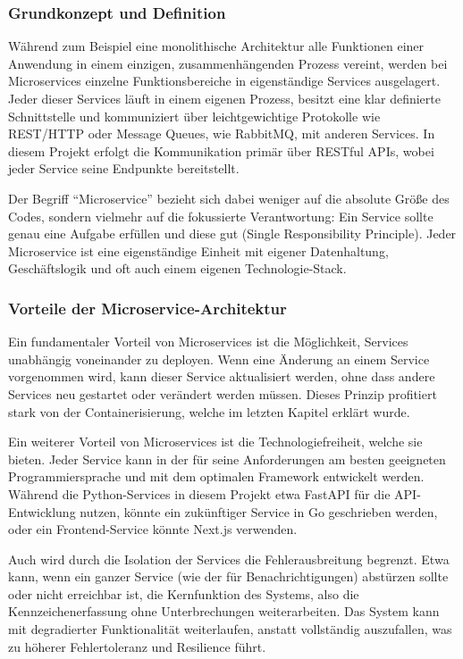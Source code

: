 \subsubsection{Grundkonzept und Definition}
Während zum Beispiel eine monolithische Architektur alle Funktionen einer Anwendung in einem einzigen, zusammenhängenden Prozess vereint, werden bei Microservices einzelne Funktionsbereiche in eigenständige Services ausgelagert.
Jeder dieser Services läuft in einem eigenen Prozess, besitzt eine klar definierte Schnittstelle und kommuniziert über leichtgewichtige Protokolle wie REST/HTTP oder Message Queues, wie RabbitMQ, mit anderen Services. \cite{aws_microservices}
In diesem Projekt erfolgt die Kommunikation primär über RESTful APIs, wobei jeder Service seine Endpunkte bereitstellt.

Der Begriff "`Microservice"' bezieht sich dabei weniger auf die absolute Größe des Codes, sondern vielmehr auf die fokussierte Verantwortung: Ein Service sollte genau eine Aufgabe erfüllen und diese gut (Single Responsibility Principle). Jeder Microservice ist eine eigenständige Einheit mit eigener Datenhaltung, Geschäftslogik und oft auch einem eigenen Technologie-Stack. \cite{oso_microservices}

\subsubsection{Vorteile der Microservice-Architektur}
Ein fundamentaler Vorteil von Microservices ist die Möglichkeit, Services unabhängig voneinander zu deployen.
Wenn eine Änderung an einem Service vorgenommen wird, kann dieser Service aktualisiert werden, ohne dass andere Services neu gestartet oder verändert werden müssen.
Dieses Prinzip profitiert stark von der Containerisierung, welche im letzten Kapitel erklärt wurde. \cite{aws_microservices}

Ein weiterer Vorteil von Microservices ist die Technologiefreiheit, welche sie bieten.
Jeder Service kann in der für seine Anforderungen am besten geeigneten Programmiersprache und mit dem optimalen Framework entwickelt werden.
Während die Python-Services in diesem Projekt etwa FastAPI für die API-Entwicklung nutzen, könnte ein zukünftiger Service in Go geschrieben werden, oder ein Frontend-Service könnte Next.js verwenden.

Auch wird durch die Isolation der Services die Fehlerausbreitung begrenzt.
Etwa kann, wenn ein ganzer Service (wie der für Benachrichtigungen) abstürzen sollte oder nicht erreichbar ist, die Kernfunktion des Systems, also die Kennzeichenerfassung ohne Unterbrechungen weiterarbeiten.
Das System kann mit degradierter Funktionalität weiterlaufen, anstatt vollständig auszufallen, was zu höherer Fehlertoleranz und Resilience führt.

